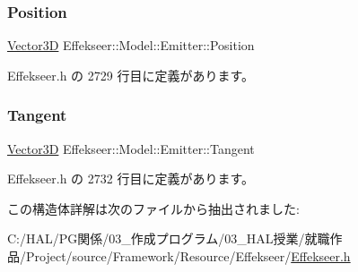 \subsubsection{\texorpdfstring{Position}{Position}}
{\footnotesize\ttfamily \mbox{\hyperlink{struct_effekseer_1_1_vector3_d}{Vector3D}} Effekseer\+::\+Model\+::\+Emitter\+::\+Position}



 Effekseer.\+h の 2729 行目に定義があります。

\mbox{\label{struct_effekseer_1_1_model_1_1_emitter_ab4f98e69e1041c999f0f191891fcb140}} 
\subsubsection{\texorpdfstring{Tangent}{Tangent}}
{\footnotesize\ttfamily \mbox{\hyperlink{struct_effekseer_1_1_vector3_d}{Vector3D}} Effekseer\+::\+Model\+::\+Emitter\+::\+Tangent}



 Effekseer.\+h の 2732 行目に定義があります。



この構造体詳解は次のファイルから抽出されました\+:\begin{DoxyCompactItemize}
\item 
C\+:/\+H\+A\+L/\+P\+G関係/03\+\_\+作成プログラム/03\+\_\+\+H\+A\+L授業/就職作品/\+Project/source/\+Framework/\+Resource/\+Effekseer/\mbox{\hyperlink{_effekseer_8h}{Effekseer.\+h}}\end{DoxyCompactItemize}
